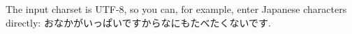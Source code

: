 The input charset is UTF-8, so you can, for example, enter Japanese characters directly: おなかがいっぱいですからなにもたべたくないです.

